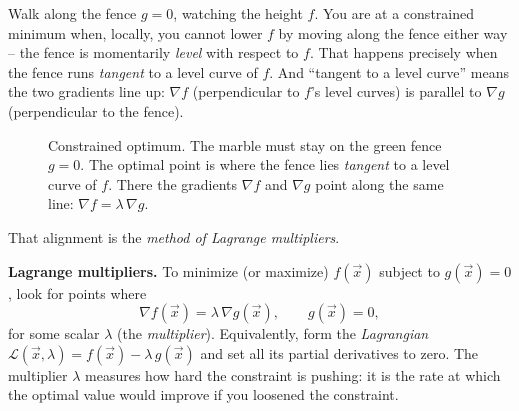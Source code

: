 \begin{intuitionbox}
Walk along the fence $g=0$, watching the height $f$. You are at a constrained
minimum when, locally, you cannot lower $f$ by moving along the fence either way --
the fence is momentarily \emph{level} with respect to $f$. That happens precisely when
the fence runs \emph{tangent} to a level curve of $f$. And ``tangent to a level
curve'' means the two gradients line up: $\nabla f$ (perpendicular to $f$'s level
curves) is parallel to $\nabla g$ (perpendicular to the fence).
\end{intuitionbox}

\begin{figure}[H]
\centering
{}
\caption{Constrained optimum. The marble must stay on the green fence $g=0$. The
optimal point is where the fence lies \emph{tangent} to a level curve of $f$.
There the gradients $\nabla f$ and $\nabla g$ point along the same line:
$\nabla f = \lambda\,\nabla g$.}
\label{ch36:fig-lagrange}
\end{figure}

That alignment is the \emph{method of Lagrange multipliers}.

\begin{formalbox}
\label{ch36:thm-lagrange}
\textbf{Lagrange multipliers.} To minimize (or maximize) $f(\vec{x})$ subject to $g(\vec{x})=0$, look for points
where
\[
  \nabla f(\vec{x}) = \lambda\,\nabla g(\vec{x}), \qquad g(\vec{x})=0,
\]
for some scalar $\lambda$ (the \emph{multiplier}). Equivalently, form the
\emph{Lagrangian} $\mathcal{L}(\vec{x},\lambda)=f(\vec{x})-\lambda\,g(\vec{x})$ and set
all its partial derivatives to zero. The multiplier $\lambda$ measures how hard the
constraint is pushing: it is the rate at which the optimal value would improve if you
loosened the constraint.
\end{formalbox}


